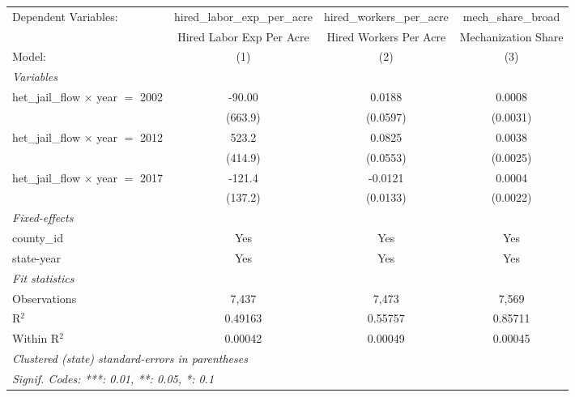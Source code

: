
\begingroup
\centering
\begin{tabular}{lccc}
   \tabularnewline \midrule \midrule
   Dependent Variables:                      & hired\_labor\_exp\_per\_acre     & hired\_workers\_per\_acre    & mech\_share\_broad\\    
                                             & Hired Labor Exp Per Acre         & Hired Workers Per Acre       & Mechanization Share \\   
   Model:                                    & (1)                              & (2)                          & (3)\\  
   \midrule
   \emph{Variables}\\
   het\_jail\_flow $\times$ year $=$ 2002    & -90.00                           & 0.0188                       & 0.0008\\   
                                             & (663.9)                          & (0.0597)                     & (0.0031)\\   
   het\_jail\_flow $\times$ year $=$ 2012    & 523.2                            & 0.0825                       & 0.0038\\   
                                             & (414.9)                          & (0.0553)                     & (0.0025)\\   
   het\_jail\_flow $\times$ year $=$ 2017    & -121.4                           & -0.0121                      & 0.0004\\   
                                             & (137.2)                          & (0.0133)                     & (0.0022)\\   
   \midrule
   \emph{Fixed-effects}\\
   county\_id                                & Yes                              & Yes                          & Yes\\  
   state-year                                & Yes                              & Yes                          & Yes\\  
   \midrule
   \emph{Fit statistics}\\
   Observations                              & 7,437                            & 7,473                        & 7,569\\  
   R$^2$                                     & 0.49163                          & 0.55757                      & 0.85711\\  
   Within R$^2$                              & 0.00042                          & 0.00049                      & 0.00045\\  
   \midrule \midrule
   \multicolumn{4}{l}{\emph{Clustered (state) standard-errors in parentheses}}\\
   \multicolumn{4}{l}{\emph{Signif. Codes: ***: 0.01, **: 0.05, *: 0.1}}\\
\end{tabular}
\par\endgroup


